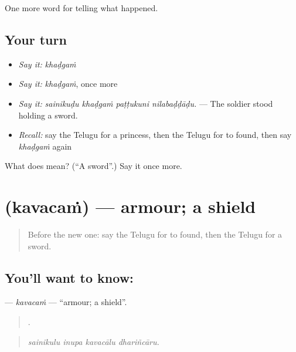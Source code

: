 \begin{grammarlens}[title={What you've built}]
One more word for telling what happened.
\end{grammarlens}

\subsection*{Your turn}
\begin{itemize}
\raggedright
  \item \emph{Say it:} \emph{khaḍgaṁ}
  \item \emph{Say it:} \emph{khaḍgaṁ}, once more
  \item \emph{Say it:} \emph{sainikuḍu khaḍgaṁ paṭṭukuni nilabaḍḍāḍu.} — The soldier stood holding a sword.
  \item \emph{Recall:} say the Telugu for a princess, then the Telugu for to found, then say \emph{khaḍgaṁ} again
\end{itemize}

\begin{tcolorbox}[breakable,colback=teal!4,colframe=teal!35!black,title={Before you move on}]
What does  mean? (\textquotedblleft{}A sword\textquotedblright{}.) Say it once more.
\end{tcolorbox}
\section[\texorpdfstring{\te{కవచం} (kavacaṁ)}{కవచం (kavacaṁ)}]{ (kavacaṁ) — armour; a shield}

\label{lesson:TE-C360-kavacam}



\begin{quote}
Before the new one: say the Telugu for to found, then the Telugu for a sword.
\end{quote}

\subsection*{You'll want to know: }
\textbf{} — \emph{kavacaṁ} — \textquotedblleft{}armour; a shield\textquotedblright{}.

\begin{quote}
   .
\end{quote}

\begin{quote}
\emph{sainikulu inupa kavacālu dhariñcāru.}
\end{quote}

